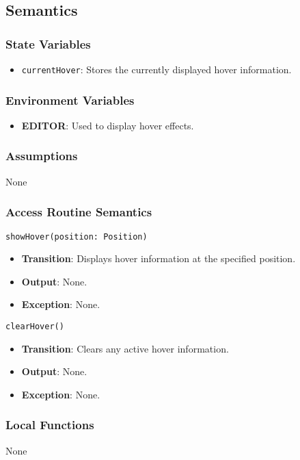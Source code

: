\documentclass[12pt, titlepage]{article}
\begin{document}
\subsection{Semantics}

\subsubsection{State Variables}
\begin{itemize}
\item \texttt{currentHover}: Stores the currently displayed hover information.
\end{itemize}

\subsubsection{Environment Variables}
\begin{itemize}
\item \textbf{EDITOR}: Used to display hover effects.
\end{itemize}

\subsubsection{Assumptions}
None

\subsubsection{Access Routine Semantics}
\texttt{showHover(position: Position)}
\begin{itemize}
\item \textbf{Transition}: Displays hover information at the specified position.
\item \textbf{Output}: None.
\item \textbf{Exception}: None.
\end{itemize}

\texttt{clearHover()}
\begin{itemize}
\item \textbf{Transition}: Clears any active hover information.
\item \textbf{Output}: None.
\item \textbf{Exception}: None.
\end{itemize}

\subsubsection{Local Functions}
None
\end{document}
